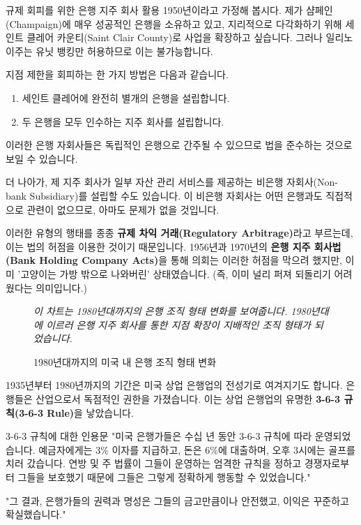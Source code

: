 \documentclass[11pt,a4paper]{article}
\theoremstyle{definition}
\begin{document}
\begin{examplebox}{규제 회피를 위한 은행 지주 회사 활용}
1950년이라고 가정해 봅시다. 제가 샴페인(Champaign)에 매우 성공적인 은행을 소유하고 있고, 지리적으로 다각화하기 위해 세인트 클레어 카운티(Saint Clair County)로 사업을 확장하고 싶습니다. 그러나 일리노이주는 유닛 뱅킹만 허용하므로 이는 불가능합니다.

지점 제한을 회피하는 한 가지 방법은 다음과 같습니다.
\begin{enumerate}
    \item 세인트 클레어에 완전히 별개의 은행을 설립합니다.
    \item 두 은행을 모두 인수하는 지주 회사를 설립합니다.
\end{enumerate}
이러한 은행 자회사들은 독립적인 은행으로 간주될 수 있으므로 법을 준수하는 것으로 보일 수 있습니다.

더 나아가, 제 지주 회사가 일부 자산 관리 서비스를 제공하는 비은행 자회사(Non-bank Subsidiary)를 설립할 수도 있습니다. 이 비은행 자회사는 어떤 은행과도 직접적으로 관련이 없으므로, 아마도 문제가 없을 것입니다.
\end{examplebox}

이러한 유형의 행태를 종종 \textbf{규제 차익 거래(Regulatory Arbitrage)}라고 부르는데, 이는 법의 허점을 이용한 것이기 때문입니다. 1956년과 1970년의 \textbf{은행 지주 회사법(Bank Holding Company Acts)}을 통해 의회는 이러한 허점을 막으려 했지만, 이미 '고양이는 가방 밖으로 나와버린' 상태였습니다. (즉, 이미 널리 퍼져 되돌리기 어려웠다는 의미입니다.)

\begin{figure}[h!]
    \centering
    \caption{1980년대까지의 미국 내 은행 조직 형태 변화}
    \label{fig:banks_1980s}
    \textit{이 차트는 1980년대까지의 은행 조직 형태 변화를 보여줍니다. 1980년대에 이르러 은행 지주 회사를 통한 지점 확장이 지배적인 조직 형태가 되었습니다.}
\end{figure}

1935년부터 1980년까지의 기간은 미국 상업 은행업의 전성기로 여겨지기도 합니다. 은행들은 산업으로서 독점적인 권한을 가졌습니다. 이는 상업 은행업의 유명한 \textbf{3-6-3 규칙(3-6-3 Rule)}을 낳았습니다.

\begin{examplebox}{3-6-3 규칙에 대한 인용문}
"미국 은행가들은 수십 년 동안 3-6-3 규칙에 따라 운영되었습니다. 예금자에게는 3\% 이자를 지급하고, 돈은 6\%에 대출하며, 오후 3시에는 골프를 치러 갔습니다. 연방 및 주 법률이 그들이 운영하는 엄격한 규칙을 정하고 경쟁자로부터 그들을 보호했기 때문에 그들은 그렇게 정확하게 행동할 수 있었습니다."

"그 결과, 은행가들의 권력과 명성은 그들의 금고만큼이나 안전했고, 이익은 꾸준하고 확실했습니다."
\end{examplebox}
\end{document}
